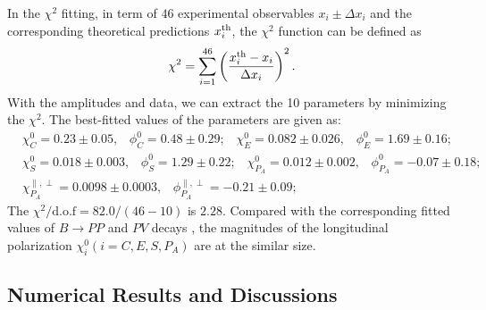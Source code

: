 \documentclass[11pt]{article}
\begin{document}
In the $\chi^2$ fitting, in term of $46$ experimental observables $x_i\pm\Delta x_i$ and the corresponding theoretical predictions $x_i^{\rm th}$, the $\chi^2$ function can be  defined as
\begin{align}
\chi^{2}=\sum_{i=1}^{46}\left(\frac{x_i^{\rm th}-x_i}{\Delta x_i}\right)^2 .
\end{align}
With the amplitudes and data,  we can extract the 10 parameters by minimizing the $\chi^2$.
The best-fitted values of the parameters are given as:
\begin{eqnarray}
   &\chi_C^{0}=0.23\pm 0.05,\,\,\,\,\, \phi_C^{0}=0.48\pm0.29;\,\,\,\,\, \chi_E^{0}=0.082\pm0.026,\,\,\,\,\, \phi_E^{0}=1.69\pm0.16;\nonumber\\
   &\chi_{S}^{0}=0.018\pm 0.003,\,\,\,\,\, \phi_{S}^{0}=1.29\pm0.22;\,\,\,\,\, \chi_{P_A}^{0}=0.012\pm0.002,\,\,\,\,\, \phi_{P_A}^{0}=-0.07\pm0.18;\nonumber\\
&\chi_{P_A}^{\parallel,\perp}=0.0098\pm 0.0003,\,\,\,\,\, \phi_{P_A}^{\parallel,\perp}=-0.21\pm0.09;\label{fitresults}
\end{eqnarray}
The $\chi^2/\mathrm{d.o.f}=82.0/(46-10)$ is $2.28$. Compared with the corresponding fitted values of $B\to PP$ and $PV$ decays \cite{Zhou:2016jkv}, the magnitudes of the longitudinal polarization $\chi_i^0(i=C,E,S,P_A)$ are at the similar size.

\subsection{Numerical Results and Discussions}
\end{document}
